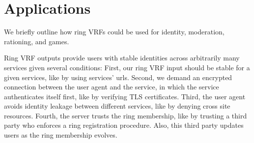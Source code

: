 \section{Applications}
\label{sec:app_short}

We briefly outline how ring VRFs could be used for
 identity, moderation, rationing, and games.


Ring VRF outputs  provide users with stable identities across
arbitrarily many services given several conditions:
First, our ring VRF input should be stable for a given services,
 like by using services' urls.
Second, we demand an encrypted connection between the user agent and
the service, in which the service authenticates itself first,
 like by verifying TLS certificates.
Third, the user agent avoids identity leakage between different services,
 like by denying cross site resources.
Fourth, the server trusts the ring membership, like by trusting
 a third party who enforces a ring registration procedure.
Also, this third party updates users as the ring membership evolves.

